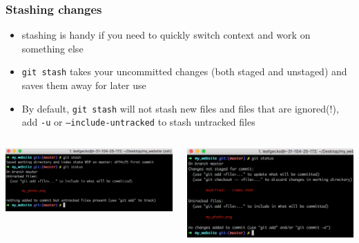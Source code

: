 \documentclass[12pt]{beamer}
\begin{document}
\begin{frame}
\frametitle{Stashing changes}
\begin{itemize}
	\item stashing is handy if you need to quickly switch context and work on something else
	\item \texttt{git stash} takes your uncommitted changes (both staged and unstaged) and saves them away for later use
	\item By default, \texttt{git stash} will not stash new files and files that are ignored(!), add \texttt{-u} or \texttt{--include-untracked} to stash untracked files
\end{itemize}
\begin{columns}
	\begin{column}{0.5\linewidth}
		\includegraphics[width=\linewidth]{stash}
	\end{column}
	\begin{column}{0.5\linewidth}
		\includegraphics[width=\linewidth]{after_stash}
	\end{column}
\end{columns}
\end{frame}
\end{document}
